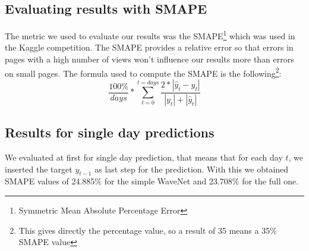 \documentclass[11pt]{article}
\begin{document}
    \subsection{Evaluating results with SMAPE}
    The metric we used to evaluate our results was the SMAPE\footnote{Symmetric Mean Absolute Percentage Error} which was used in the Kaggle competition. The SMAPE provides a relative error so that errors in pages with a high number of views won't influence our results more than errors on small pages. The formula used to compute the SMAPE is the following\footnote{This gives directly the percentage value, so a result of 35 means a 35\% SMAPE value}:
    \begin{equation*}
        \frac{100\%}{days} * \sum_{t=0}^{t=days}\frac{2 * |\hat{y}_t-y_t|}{|y_t| + |\hat{y}_t|}
    \end{equation*}
    \subsection{Results for single day predictions}
    We evaluated at first for single day prediction, that means that for each day $t$, we inserted the target $y_{t-1}$ as last step for the prediction. With this we obtained SMAPE values of 24.885\% for the simple WaveNet and 23.708\% for the full one.
\end{document}
